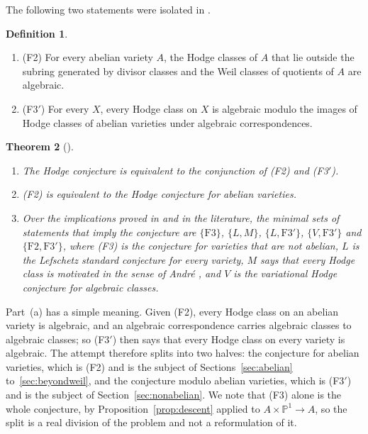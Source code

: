 \documentclass[11pt]{amsart}
\newtheorem{theorem}{Theorem}[section]
\theoremstyle{definition}
\newtheorem{definition}[theorem]{Definition}
\theoremstyle{remark}
\newcommand{\PP}{\mathbb{P}}
\begin{document}
The following two statements were isolated in \cite[Section~14]{BhH8}.

\begin{definition}\label{def:f2f3}
\begin{enumerate}[label=(\roman*)]
\item (F2) For every abelian variety $A$, the Hodge classes of $A$ that lie
outside the subring generated by divisor classes and the Weil classes of
quotients of $A$ are algebraic.
\item (F3$'$) For every $X$, every Hodge class on $X$ is algebraic modulo
the images of Hodge classes of abelian varieties under algebraic
correspondences.
\end{enumerate}
\end{definition}

\begin{theorem}[{\cite[Theorem 14.1(iv), Propositions on (F2) and (F3$'$)]{BhH8}}]\label{thm:shape}
\begin{enumerate}[label=(\alph*)]
\item The Hodge conjecture is equivalent to the conjunction of
\textup{(F2)} and \textup{(F3$'$)}.
\item \textup{(F2)} is equivalent to the Hodge conjecture for abelian
varieties.
\item Over the implications proved in \cite{BhH8} and in the literature,
the minimal sets of statements that imply the conjecture are
$\{\mathrm{F3}\}$, $\{L,M\}$, $\{L,\mathrm{F3}'\}$, $\{V,\mathrm{F3}'\}$ and
$\{\mathrm{F2},\mathrm{F3}'\}$, where \textup{(F3)} is the conjecture for
varieties that are not abelian, $L$ is the Lefschetz standard conjecture for
every variety, $M$ says that every Hodge class is motivated in the sense of
Andr\'e \cite{And96}, and $V$ is the variational Hodge conjecture for
algebraic classes.
\end{enumerate}
\end{theorem}

Part~(a) has a simple meaning. Given (F2), every Hodge class on an abelian
variety is algebraic, and an algebraic correspondence carries algebraic
classes to algebraic classes; so (F3$'$) then says that every Hodge class on
every variety is algebraic. The attempt therefore splits into two halves:
the conjecture for abelian varieties, which is (F2) and is the subject of
Sections~\ref{sec:abelian} to~\ref{sec:beyondweil}, and the conjecture modulo
abelian varieties, which is (F3$'$) and is the subject of
Section~\ref{sec:nonabelian}. We note that (F3) alone is the whole
conjecture, by Proposition~\ref{prop:descent} applied to $A\times\PP^{1}\to A$,
so the split is a real division of the problem and not a reformulation of
it.
\end{document}
